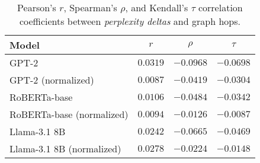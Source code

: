 \documentclass[11pt]{article}
\begin{document}
\begin{table*}
  \centering
  \begin{tabular}{l c c c}
    \toprule
    Model & $r$ & $\rho$ & $\tau$ \\
    \midrule
    GPT-2 & $0.0319$ & $-0.0968$ & $-0.0698$ \\
    GPT-2 (normalized) & $0.0087$ & $-0.0419$ & $-0.0304$ \\
    RoBERTa-base & $0.0106$ & $-0.0484$ & $-0.0342$ \\
    RoBERTa-base (normalized) & $0.0094$ & $-0.0126$ & $-0.0087$ \\
    Llama-3.1 8B & $0.0242$ & $-0.0665$ & $-0.0469$ \\
    Llama-3.1 8B (normalized) & $0.0278$ & $-0.0224$ & $-0.0148$ \\
    \bottomrule
  \end{tabular}
  \caption{Pearson's $r$, Spearman's $\rho$, and Kendall's $\tau$ correlation coefficients between \emph{perplexity deltas} and graph hops.}
  \label{delta_correlations}
\end{table*}
%
% 



\appendix
\onecolumn
\end{document}
